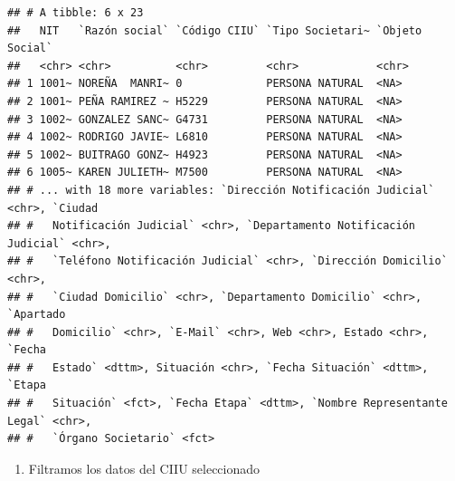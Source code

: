 \documentclass[
  11pt,
  a4paper,
]{book}
\providecommand{\tightlist}{%
  \setlength{\itemsep}{0pt}\setlength{\parskip}{0pt}}
\begin{document}
\begin{verbatim}
## # A tibble: 6 x 23
##   NIT   `Razón social` `Código CIIU` `Tipo Societari~ `Objeto Social`
##   <chr> <chr>          <chr>         <chr>            <chr>          
## 1 1001~ NOREÑA  MANRI~ 0             PERSONA NATURAL  <NA>           
## 2 1001~ PEÑA RAMIREZ ~ H5229         PERSONA NATURAL  <NA>           
## 3 1002~ GONZALEZ SANC~ G4731         PERSONA NATURAL  <NA>           
## 4 1002~ RODRIGO JAVIE~ L6810         PERSONA NATURAL  <NA>           
## 5 1002~ BUITRAGO GONZ~ H4923         PERSONA NATURAL  <NA>           
## 6 1005~ KAREN JULIETH~ M7500         PERSONA NATURAL  <NA>           
## # ... with 18 more variables: `Dirección Notificación Judicial` <chr>, `Ciudad
## #   Notificación Judicial` <chr>, `Departamento Notificación Judicial` <chr>,
## #   `Teléfono Notificación Judicial` <chr>, `Dirección Domicilio` <chr>,
## #   `Ciudad Domicilio` <chr>, `Departamento Domicilio` <chr>, `Apartado
## #   Domicilio` <chr>, `E-Mail` <chr>, Web <chr>, Estado <chr>, `Fecha
## #   Estado` <dttm>, Situación <chr>, `Fecha Situación` <dttm>, `Etapa
## #   Situación` <fct>, `Fecha Etapa` <dttm>, `Nombre Representante Legal` <chr>,
## #   `Órgano Societario` <fct>
\end{verbatim}

\begin{enumerate}
\def\labelenumi{\arabic{enumi}.}
\setcounter{enumi}{1}
\tightlist
\item
  Filtramos los datos del CIIU seleccionado
\end{enumerate}
\end{document}
